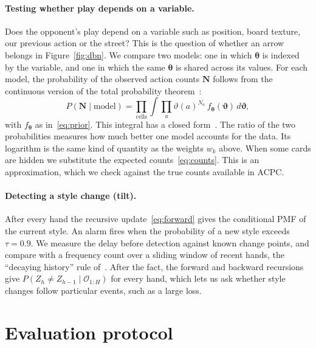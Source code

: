 \documentclass[11pt,a4paper]{article}
\newcommand{\Z}{Z}            %
\newcommand{\1}{\mathbf{1}}
\newcommand{\BT}[1]{\cite[§#1]{bertsekas2000}}
\begin{document}
\paragraph{Testing whether play depends on a variable.} Does the opponent's play
depend on a variable such as position, board texture, our previous action or
the street? This is the question of whether an arrow belongs in
Figure~\ref{fig:dbn}. We compare two models: one in which $\bm\theta$ is indexed
by the variable, and one in which the same $\bm\theta$ is shared across its
values. For each model, the probability of the observed action counts
$\mathbf{N}$ follows from the continuous version of the total probability
theorem~\BT{3.5}:
\begin{equation}
  P(\mathbf{N}\mid\text{model})=\prod_{\text{cells}}\int
  \prod_a \vartheta(a)^{N_a}\, f_{\bm\theta}(\bm\vartheta)\,d\bm\vartheta,
\end{equation}
with $f_{\bm\theta}$ as in~\eqref{eq:prior}. This integral has a closed
form~\cite{heckerman1995}. The ratio of the two probabilities measures how much
better one model accounts for the data. Its logarithm is the same kind of
quantity as the weights $w_k$ above. When some cards are hidden we substitute
the expected counts~\eqref{eq:counts}. This is an approximation, which we check
against the true counts available in ACPC.

\paragraph{Detecting a style change (tilt).} After every hand the recursive
update~\eqref{eq:forward} gives the conditional PMF of the current style. An
alarm fires when the probability of a new style exceeds $\tau=0.9$. We measure
the delay before detection against known change points, and compare with a
frequency count over a sliding window of recent hands, the ``decaying history''
rule of~\cite{southey2005}. After the fact, the forward and backward recursions
give $P(\Z_h\neq\Z_{h-1}\mid\mathcal{O}_{1:H})$ for every hand, which lets us ask
whether style changes follow particular events, such as a large loss.

\section{Evaluation protocol}\label{sec:eval}
\end{document}
